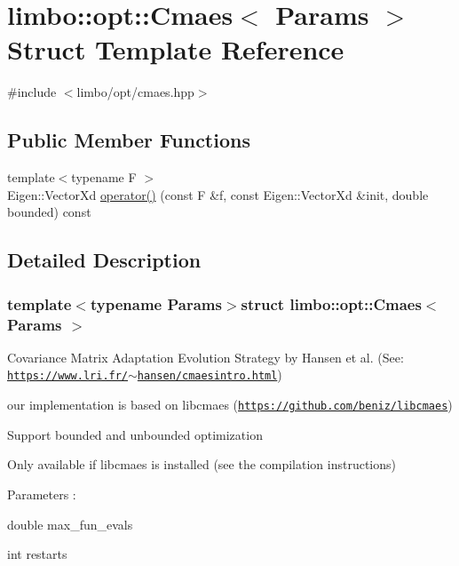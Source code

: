 \hypertarget{structlimbo_1_1opt_1_1_cmaes}{}\section{limbo\+:\+:opt\+:\+:Cmaes$<$ Params $>$ Struct Template Reference}
\label{structlimbo_1_1opt_1_1_cmaes}


{\ttfamily \#include $<$limbo/opt/cmaes.\+hpp$>$}

\subsection*{Public Member Functions}
\begin{DoxyCompactItemize}
\item 
{\footnotesize template$<$typename F $>$ }\\Eigen\+::\+Vector\+Xd \hyperlink{structlimbo_1_1opt_1_1_cmaes_a47ee6970bd2300108c83281ea6fced17}{operator()} (const F \&f, const Eigen\+::\+Vector\+Xd \&init, double bounded) const 
\end{DoxyCompactItemize}


\subsection{Detailed Description}
\subsubsection*{template$<$typename Params$>$struct limbo\+::opt\+::\+Cmaes$<$ Params $>$}

Covariance Matrix Adaptation Evolution Strategy by Hansen et al. (See\+: \href{https://www.lri.fr/~hansen/cmaesintro.html}{\tt https\+://www.\+lri.\+fr/$\sim$hansen/cmaesintro.\+html})
\begin{DoxyItemize}
\item our implementation is based on libcmaes (\href{https://github.com/beniz/libcmaes}{\tt https\+://github.\+com/beniz/libcmaes})
\item Support bounded and unbounded optimization
\item Only available if libcmaes is installed (see the compilation instructions)
\item Parameters \+:
\begin{DoxyItemize}
\item double max\+\_\+fun\+\_\+evals
\item int restarts 
\end{DoxyItemize}
\end{DoxyItemize}


